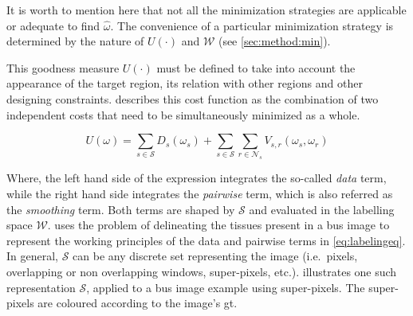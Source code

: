 It is worth to mention here that not all the minimization strategies are applicable or adequate to find $\hat{\omega}$.
The convenience of a particular minimization strategy is determined by the nature of $U(\cdot)$ and $\mathcal{W}$ (see \cref{sec:method:min}).

This goodness measure $U(\cdot)$ must be defined to take into account the appearance of the target region, its relation with other regions and other designing constraints.
 describes this cost function as the combination of two independent costs that need to be simultaneously minimized as a whole.

\begin{equation}
  U(\omega) = \sum_{s\in \mathcal{S}} D_s(\omega_s) + \sum_{s \in \mathcal{S}}\sum_{r \in \mathcal{N}_{s}} V_{s,r}(\omega_s,\omega_r)
  \label{eq:labelingeq}
\end{equation}

Where, the left hand side of the expression integrates the so-called \emph{data} term, while the right hand side integrates the \emph{pairwise} term, which is also referred as the \emph{smoothing} term.
Both terms are shaped by $\mathcal{S}$ and evaluated in the labelling space $\mathcal{W}$.
 uses the problem of delineating the tissues present in a \ac{bus} image to represent the working principles of the data and pairwise terms in \cref{eq:labelingeq}.
In general, $\mathcal{S}$ can be any discrete set representing the image (i.e.\, pixels, overlapping or non overlapping windows, super-pixels, etc.). 
 illustrates one such representation $\mathcal{S}$, applied to a \ac{bus} image example using super-pixels. The super-pixels are coloured according to the image's \ac{gt}.


